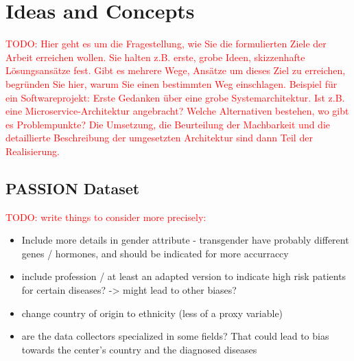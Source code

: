 \documentclass[12pt, a4paper, oneside]{book}   	%
\renewcommand{\todo}[1]{\textcolor{red}{TODO: #1}}
\begin{document}
	
	
	\chapter{Ideas and Concepts}
		\todo{Hier geht es um die Fragestellung, wie Sie die formulierten Ziele der Arbeit erreichen wollen. Sie halten z.B. erste, grobe Ideen, skizzenhafte Lösungsansätze fest. Gibt es mehrere Wege, Ansätze um dieses Ziel zu erreichen, begründen Sie hier, warum Sie einen bestimmten Weg einschlagen. Beispiel für ein Softwareprojekt: Erste Gedanken über eine grobe Systemarchitektur. Ist z.B. eine Microservice-Architektur angebracht? Welche Alternativen bestehen, wo gibt es Problempunkte? Die Umsetzung, die Beurteilung der Machbarkeit und die detaillierte Beschreibung der umgesetzten Architektur sind dann Teil der Realisierung.}
		
		\section{PASSION Dataset}
			\todo{write things to consider more precisely:}
			\begin{itemize}
				\item Include more details in gender attribute - transgender have probably different genes / hormones, and should be indicated for more accurraccy
				\item include profession / at least an adapted version to indicate high risk patients for certain diseases? -> might lead to other biases?
				\item change country of origin to ethnicity (less of a proxy variable)
				\item are the data collectors specialized in some fields? That could lead to bias towards the center's country and the diagnosed diseases
			\end{itemize}
			
\end{document}
